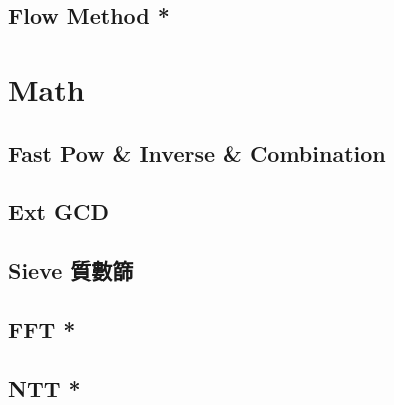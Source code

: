 \documentclass[a4paper,10pt,twocolumn,oneside]{article}
\begin{document}
\subsection{Flow Method *}
% 

\section{Math}

\subsection{Fast Pow \& Inverse \& Combination}


\subsection{Ext GCD}


\subsection{Sieve 質數篩}


\subsection{FFT *}


\subsection{NTT *}


% 

% 

% 
\end{document}
